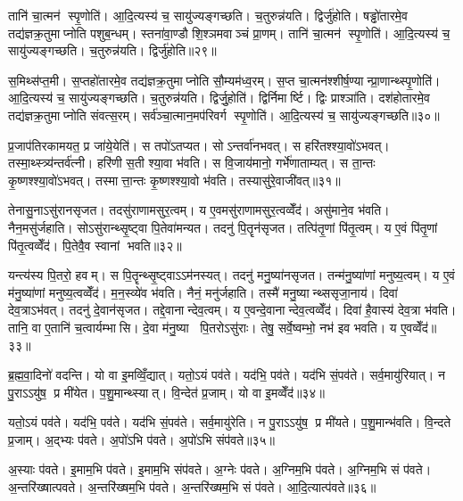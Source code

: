 तानि॑ चा॒त्मन॑ स्पृ॒णोति॑। आ॒दि॒त्यस्य॑ च॒ सायु॑ज्यङ्गच्छति। च॒तुरुन्न॑यति। द्विर्जु॑होति। षड्ढो॑तारमे॒व तद्य॑ज्ञक्र॒तुमाप्नोति पशुब॒न्धम्। स्तना॑वा॒ण्डौ शि॒श्ञमवाञ्चं प्रा॒णम्। तानि॑ चा॒त्मन॑ स्पृ॒णोति॑। आ॒दि॒त्यस्य॑ च॒ सायु॑ज्यङ्गच्छति। च॒तुरुन्न॑यति। द्विर्जु॑होति॥२९॥

स॒मिथ्स॑प्त॒मी। स॒प्तहो॑तारमे॒व तद्य॑ज्ञक्र॒तुमाप्नोति सौ॒म्यम॑ध्व॒रम्। स॒प्त चा॒त्मन॑श्शीर्\mbox{}ष॒ण्यान्प्रा॒णान्थ्स्पृ॒णोति॑। आ॒दि॒त्यस्य॑ च॒ सायु॑ज्यङ्गच्छति। च॒तुरुन्न॑यति। द्विर्जु॒होति॑। द्विर्निमार्ष्टि। द्विः प्राश्ञा॑ति। दश॑होतारमे॒व तद्य॑ज्ञक्र॒तुमाप्नोति संवत्स॒रम्। सर्व॑ञ्चा॒त्मान॒मप॑रिवर्ग स्पृ॒णोति॑। आ॒दि॒त्यस्य॑ च॒ सायु॑ज्यङ्गच्छति॥३०॥\anuvakamend[अ॒ग्नि॒हो॒त्रं म॒ज्जान॒न्द्विर्जु॑हो॒त्यप॑रिवर्ग स्पृ॒णोत्येक॑ञ्च]

प्र॒जाप॑तिरकामयत॒ प्र जा॑ये॒येति॑। स तपो॑ऽतप्यत। सोऽन्तर्वा॑नभवत्। स हरि॑तश्श्या॒वो॑ऽभवत्। तस्मा॒थ्स्त्र्य॑न्तर्व॑त्नी। हरि॑णी स॒ती श्या॒वा भ॑वति। स वि॒जाय॑मानो॒ गर्भे॑णाताम्यत्। स ता॒न्तः कृ॒ष्णश्श्या॒वो॑ऽभवत्। तस्मात्ता॒न्तः कृ॒ष्णश्श्या॒वो भ॑वति। तस्यासु॑रे॒वाजी॑वत्॥३१॥

तेनासु॒नाऽसु॑रानसृजत। तदसु॑राणामसुर॒त्वम्। य ए॒वमसु॑राणामसुर॒त्वव्वेँद॑। असु॑माने॒व भ॑वति। नैन॒मसु॑र्जहाति। सोऽसु॑रान्थ्सृ॒ष्ट्वा पि॒तेवा॑मन्यत। तदनु॑ पि॒तॄन॑सृजत। तत्पि॑तृ॒णां पि॑तृ॒त्वम्। य ए॒वं पि॑तृ॒णां पि॑तृ॒त्वव्वेँद॑। पि॒तेवै॒व स्वानां भवति॥३२॥

यन्त्य॑स्य पि॒तरो॒ हवम्। स पि॒तॄन्थ्सृ॒ष्ट्वाऽऽम॑नस्यत्। तदनु॑ मनु॒ष्या॑नसृजत। तन्म॑नु॒ष्या॑णां मनुष्य॒त्वम्। य ए॒वं म॑नु॒ष्या॑णां मनुष्य॒त्वव्वेँद॑। म॒न॒स्व्ये॑व भ॑वति। नैनं॒ मनु॑र्जहाति। तस्मै॑ मनु॒ष्यान्थ्ससृजा॒नाय॑। दिवा॑ देव॒त्राऽभ॑वत्। तदनु॑ दे॒वान॑सृजत। तद्दे॒वानान्देव॒त्वम्। य ए॒वन्दे॒वानान्देव॒त्वव्वेँद॑। दिवा॑ है॒वास्य॑ देव॒त्रा भ॑वति। तानि॒ वा ए॒तानि॑ च॒त्वार्यम्भासि। दे॒वा म॑नु॒ष्या पि॒तरोऽसु॑राः। तेषु॒ सर्वे॒ष्वम्भो॒ नभ॑ इव भवति। य ए॒वव्वेँद॑॥३३॥\anuvakamend[अ॒जी॒व॒थ्स्वानां भवति दे॒वान॑सृजत स॒प्त च॑]

ब्र॒ह्म॒वा॒दिनो॑ वदन्ति। यो वा इ॒मव्विँ॒द्यात्। यतो॒ऽयं पव॑ते। यद॑भि॒ पव॑ते। यद॑भि सं॒पव॑ते। सर्व॒मायु॑रियात्। न पु॒राऽऽयु॑ष॒ प्र मी॑येत। प॒शु॒मान्थ्स्यात्। वि॒न्देत॑ प्र॒जाम्। यो वा इ॒मव्वेँद॑॥३४॥

यतो॒ऽयं पव॑ते। यद॑भि॒ पव॑ते। यद॑भि सं॒पव॑ते। सर्व॒मायु॑रेति। न पु॒राऽऽयु॑ष॒ प्र मी॑यते। प॒शु॒मान्भ॑वति। वि॒न्दते प्र॒जाम्। अ॒द्भ्यः प॑वते। अ॒पो॑ऽभि प॑वते। अ॒पो॑ऽभि संप॑वते॥३५॥

अ॒स्याः प॑वते। इ॒माम॒भि प॑वते। इ॒माम॒भि संप॑वते। अ॒ग्नेः प॑वते। अ॒ग्निम॒भि प॑वते। अ॒ग्निम॒भि सं प॑वते। अ॒न्तरि॑ख्षात्पवते। अ॒न्तरि॑ख्षम॒भि प॑वते। अ॒न्तरि॑ख्षम॒भि सं प॑वते। आ॒दि॒त्यात्प॑वते॥३६॥

